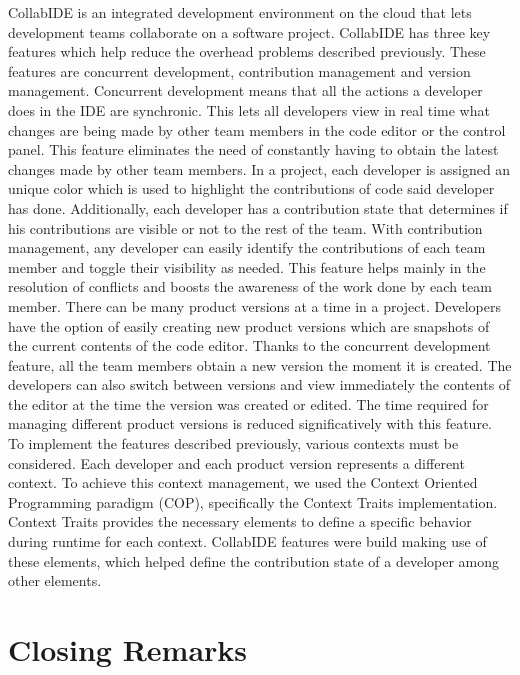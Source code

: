 \documentclass[10pt, conference, draft]{IEEEtran}
\begin{document}
CollabIDE is an integrated development environment on the cloud that lets development teams collaborate on a software project. CollabIDE has three key features which help reduce the overhead problems described previously. These features are concurrent development, contribution management and version management.
Concurrent development means that all the actions a developer does in the IDE are synchronic. This lets all developers view in real time what changes are being made by other team members in the code editor or the control panel. This feature eliminates the need of constantly having to obtain the latest changes made by other team members. 
In a project, each developer is assigned an unique color which is used to highlight the contributions of code said developer has done. Additionally, each developer has a contribution state that determines if his contributions are visible or not to the rest of the team. With contribution management, any developer can easily identify the contributions of each team member and toggle their visibility as needed. This feature helps mainly in the resolution of conflicts and boosts the awareness of the work done by each team member.
There can be many product versions at a time in a project. Developers have the option of easily creating new product versions which are snapshots of the current contents of the code editor. Thanks to the concurrent development feature, all the team members obtain a new version the moment it is created. The developers can also switch between versions and view immediately the contents of the editor at the time the version was created or edited. The time required for managing different product versions is reduced significatively with this feature.
To implement the features described previously, various contexts must be considered. Each developer and each product version represents a different context. To achieve this context management, we used the Context Oriented Programming paradigm (COP), specifically the Context Traits implementation. Context Traits provides the necessary elements to define a specific behavior during runtime for each context. CollabIDE features were build making use of these elements, which helped define the contribution state of a developer among other elements.

\section{Closing Remarks}
\label{sec:conclusion}





%


  
\end{document}
